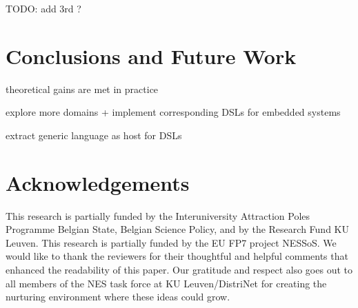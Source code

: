 \documentclass[conference]{IEEEtran}
\begin{document}
TODO: add 3rd ? \cite{krontiris2009cooperative}

\section{Conclusions and Future Work}

theoretical gains are met in practice

explore more domains + implement corresponding DSLs for embedded systems

extract generic language as host for DSLs

\section*{Acknowledgements}

This research is partially funded by the Interuniversity Attraction Poles
Programme Belgian State, Belgian Science Policy, and by the Research Fund KU
Leuven. This research is partially funded by the EU FP7 project NESSoS. We
would like to thank the reviewers for their thoughtful and helpful comments
that enhanced the readability of this paper. Our gratitude and respect also
goes out to all members of the NES task force at KU Leuven/DistriNet for
creating the nurturing environment where these ideas could grow.



\end{document}
